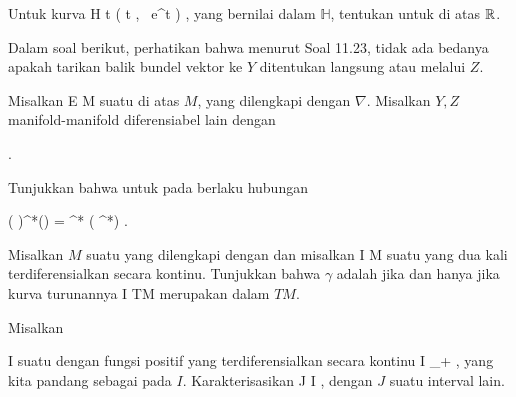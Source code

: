 {}
{

Untuk kurva
\maabbeledisp {\psi} {\R} { {\mathbb H}
} { t } { \left(  t   , \,  e^t                   \right)
} {,}
yang bernilai dalam
${\mathbb H}$, tentukan
untuk
 {} {}
di atas ${\mathbb R}$.

}
{} {}

Dalam soal berikut, perhatikan bahwa menurut
Soal 11.23,
tidak ada bedanya apakah tarikan balik bundel vektor ke $Y$ ditentukan langsung atau melalui $Z$.

{}
{

Misalkan
 { E } { M
} {}
suatu
di atas
$M$, yang dilengkapi dengan
$\nabla$. Misalkan $Y,Z$ manifold-manifold diferensiabel lain dengan

 { . }

Tunjukkan bahwa untuk
pada
 berlaku hubungan

\mavergleichskettedisp
{\vergleichskette
{ \left(  \psi \circ \varphi  \right)^*(\nabla)
}
{ =} { \varphi^*  \left(  \psi^*\nabla  \right)
}
{ } {
}
{ } {
}
{ } {
}
}
{}{}{.}

}
{} {}

{}
{

Misalkan $M$ suatu
yang dilengkapi dengan
dan misalkan
\maabbdisp {\gamma} { I } { M
} {}
suatu
yang dua kali terdiferensialkan secara kontinu. Tunjukkan bahwa $\gamma$ adalah
jika dan hanya jika kurva turunannya
 { I } { TM
} {}
merupakan
dalam
$TM$.

}
{} {}

{}
{

Misalkan

\mavergleichskette
{\vergleichskette
{ I
}
{ \subseteq }{ \R
}
{  }{
}
{    }{
}
{   }{
}
}
{}{}{}
suatu
dengan fungsi positif yang terdiferensialkan secara kontinu
 { I } { \R_+
} {,}
yang kita pandang sebagai
pada $I$. Karakterisasikan
\maabbdisp {\gamma} { J } { I
} {,}
dengan $J$ suatu interval lain.

}
{} {}

